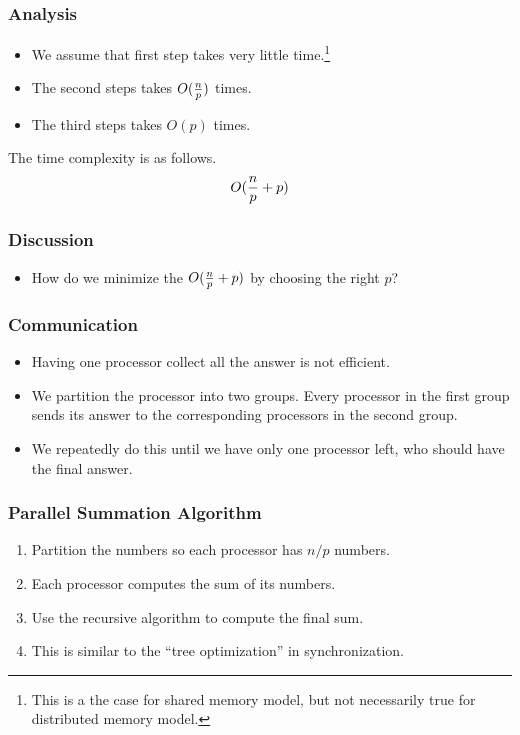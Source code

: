 \documentclass{beamer}
\begin{document}
\begin{CJK}{UTF8}{bsmi}
\begin{frame}
\frametitle{Analysis}
\begin{itemize}
\item We assume that first step takes very little time.\footnote{This
  is a the case for shared memory model, but not necessarily true for
  distributed memory model.}
\item The second steps takes $O({n \over p})$ times.
\item The third steps takes $O(p)$ times.
\end{itemize}
The time complexity is as follows.
\begin{equation}
O({n \over p} + p)
\end{equation}
\end{frame}

\begin{frame}
\frametitle{Discussion}
\begin{itemize}
\item How do we minimize the $O({n \over p} + p)$ by choosing the
  right $p$?
\end{itemize}
\end{frame}

\begin{frame}
\frametitle{Communication}
\begin{itemize}
\item Having one processor collect all the answer is not efficient.
\item We partition the processor into two groups.  Every processor in
  the first group sends its answer to the corresponding processors in
  the second group.
\item We repeatedly do this until we have only one processor left,
  who should have the final answer.
\end{itemize}
\end{frame}

\begin{frame}
\frametitle{Parallel Summation Algorithm}
\begin{enumerate}
\item Partition the numbers so each processor has $n/p$ numbers.
\item Each processor computes the sum of its numbers.
\item Use the recursive algorithm to compute the final sum.
\item This is similar to the ``tree optimization'' in synchronization.
\end{enumerate}
\end{frame}


\end{CJK}
\end{document}
